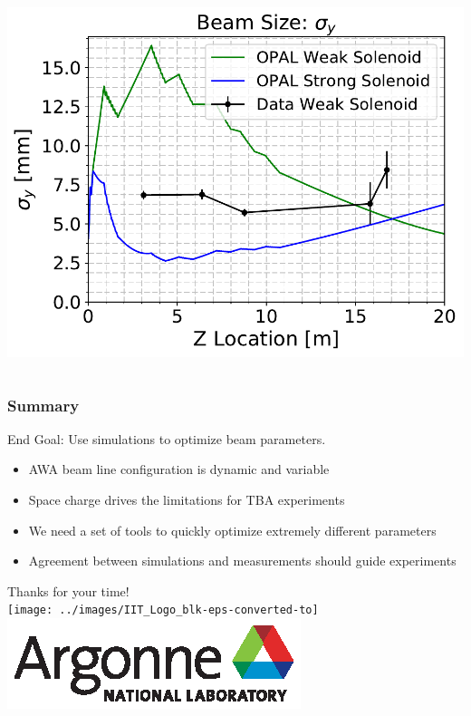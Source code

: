 \documentclass[professionalfonts,t]{beamer}
\begin{document}
\begin{frame}
\begin{columns}[T]
\begin{column}{.5\textwidth}
		\includegraphics[width=0.75\linewidth]{../images/beamsizes_3Dy}
	\end{column}%
\end{columns}
\end{frame}
\begin{frame}
	\frametitle{Summary}
	\vspace{3em}
	End Goal: Use simulations to optimize beam parameters. 
	\begin{itemize}		
		\item AWA beam line configuration is dynamic and variable
		\item Space charge {\tiny {\tiny }}drives the limitations for TBA experiments
		\item We need a set of tools to quickly optimize extremely different parameters
		\item Agreement between simulations and measurements should guide experiments
	
	\end{itemize}
\end{frame}
\begin{frame}
\vspace{5em}
\Huge {Thanks for your time!} \\ 
\texttt{[image: ../images/IIT\_Logo\_blk-eps-converted-to]} %
\includegraphics[width=0.5\linewidth]{../images/Argonne_cmyk_black}%
\\
\end{frame}
\end{document}
